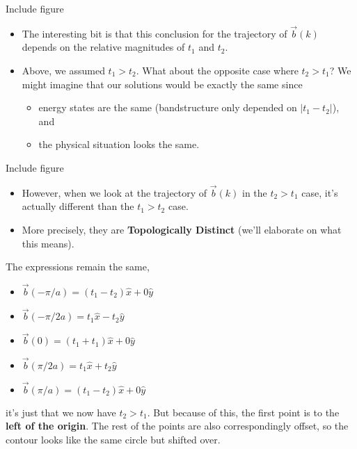 \documentclass[11pt]{article}
\begin{document}
\begin{center}
  Include figure
\end{center}

\begin{itemize}
  \item The interesting bit is that this conclusion for the trajectory of $\vec{b}(k)$ depends on the relative magnitudes of $t_1$ and $t_2$.
  
  \item Above, we assumed $t_1 > t_2$. What about the opposite case where $t_2 > t_1$? We might imagine that our solutions would be exactly the same since 
  \begin{itemize}
    \item energy states are the same (bandstructure only depended on $|t_1 - t_2|$), and
    \item the physical situation looks the same.
  \end{itemize}
\end{itemize}

\begin{center}
  Include figure
\end{center} 

\begin{itemize}
  \item However, when we look at the trajectory of $\vec{b}(k)$ in the $t_2 > t_1$ case, it's actually \color{blue} different \color{black} than the $t_1 > t_2$ case.
  
  \item More precisely, they are \textbf{Topologically Distinct} (we'll elaborate on what this means).
\end{itemize} The expressions remain the same, \begin{itemize}
  \item $\vec{b}(-\pi/a) = (t_1 - t_2)\hat{x} + 0\hat{y}$
  \item $\vec{b}(-\pi/2a) = t_1\hat{x} -t_2 \hat{y}$
  \item $\vec{b}(0) = (t_1 + t_1)\hat{x} + 0\hat{y}$
  \item $\vec{b}(\pi/2a) = t_1\hat{x} + t_2 \hat{y}$
  \item $\vec{b}(\pi/a) = (t_1 - t_2)\hat{x} + 0\hat{y}$
\end{itemize} it's just that we now have $t_2 > t_1$. But because of this, the first point is to the \textbf{left of the origin}. The rest of the points are also correspondingly offset, so the contour looks like the same circle but shifted over.
\end{document}

